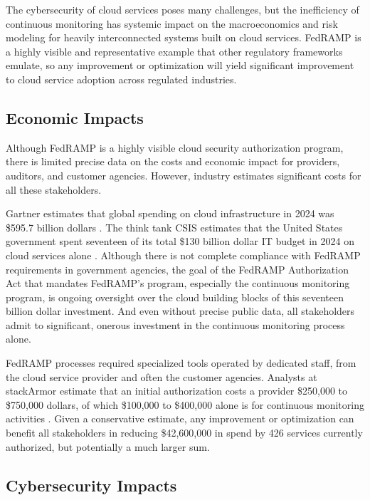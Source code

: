 \documentclass{jdf}
\begin{document}
The cybersecurity of cloud services poses many challenges, but the inefficiency of continuous monitoring has systemic impact on the macroeconomics and risk modeling for heavily interconnected systems built on cloud services. FedRAMP is a highly visible and representative example that other regulatory frameworks emulate, so any improvement or optimization will yield significant improvement to cloud service adoption across regulated industries.

\subsection{Economic Impacts}

Although FedRAMP is a highly visible cloud security authorization program, there is limited precise data on the costs and economic impact for providers, auditors, and customer agencies. However, industry estimates significant costs for all these stakeholders.

Gartner estimates that global spending on cloud infrastructure in 2024 was \$595.7 billion dollars \citeyear{gartner24}. The think tank CSIS estimates that the United States government spent seventeen of its total \$130 billion dollar IT budget in 2024 on cloud services alone \citeyear[p.~1]{csis25}. Although there is not complete compliance with FedRAMP requirements in government agencies, the goal of the FedRAMP Authorization Act that mandates FedRAMP's program, especially the continuous monitoring program, is ongoing oversight over the cloud building blocks of this seventeen billion dollar investment. And even without precise public data, all stakeholders admit to significant, onerous investment in the continuous monitoring process alone.

FedRAMP processes required specialized tools operated by dedicated staff, from the cloud service provider and often the customer agencies. Analysts at stackArmor estimate that an initial authorization costs a provider \$250,000 to \$750,000 dollars, of which \$100,000 to \$400,000 alone is for continuous monitoring activities \citeyear{stackarmor24}. Given a conservative estimate, any improvement or optimization can benefit all stakeholders in reducing \$42,600,000 in spend by 426 services currently authorized, but potentially a much larger sum.

\subsection{Cybersecurity Impacts}
\end{document}

